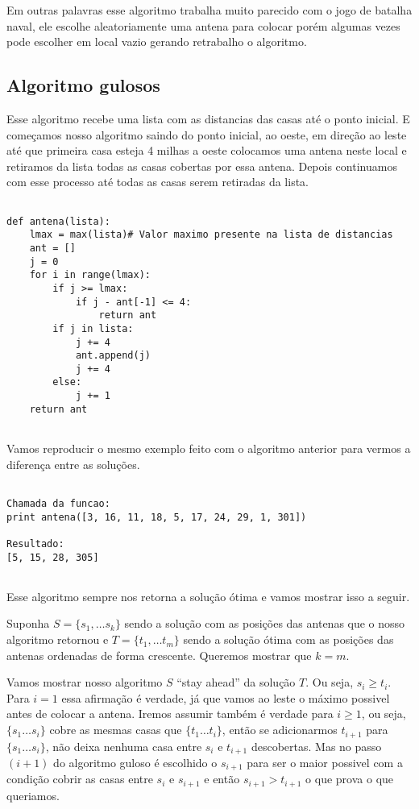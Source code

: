 \documentclass[11pt]{article}
\begin{document}
Em outras palavras esse algoritmo trabalha muito parecido com o jogo de batalha naval, ele escolhe aleatoriamente uma antena para
colocar porém algumas vezes pode escolher em local vazio gerando retrabalho o algoritmo.

\subsection{Algoritmo gulosos}

\label{sec-3-3}

Esse algoritmo recebe uma lista com as distancias das casas até o ponto inicial. 
E começamos nosso algoritmo saindo do ponto inicial, ao oeste, em direção ao leste até que primeira casa esteja 4 milhas a oeste 
colocamos uma antena neste local e retiramos da lista todas as casas cobertas por essa antena. Depois continuamos com esse processo
até todas as casas serem retiradas da lista.

\begin{verbatim}

def antena(lista):
    lmax = max(lista)# Valor maximo presente na lista de distancias
    ant = []
    j = 0
    for i in range(lmax):
        if j >= lmax:
            if j - ant[-1] <= 4:
                return ant
        if j in lista:
            j += 4
            ant.append(j)
            j += 4
        else:
            j += 1
    return ant
 
\end{verbatim}

Vamos reproducir o mesmo exemplo feito com o algoritmo anterior para vermos a diferença entre as soluções.

\begin{verbatim}

Chamada da funcao:
print antena([3, 16, 11, 18, 5, 17, 24, 29, 1, 301])

Resultado:
[5, 15, 28, 305]
 
\end{verbatim}

Esse algoritmo sempre nos retorna a solução ótima e vamos mostrar isso a seguir.

Suponha $S = \{ s_1, \ldots s_k \}$ sendo a solução com as posições das antenas 
que o nosso algoritmo retornou e $T = \{ t_1, \ldots t_m \}$ sendo a solução ótima com as posições 
das antenas ordenadas de forma crescente. Queremos mostrar que $k=m$.

Vamos mostrar nosso algoritmo $S$ ``stay ahead'' da solução $T$. Ou seja, $s_i \geq t_i$.
Para $i = 1$ essa afirmação é verdade, já que vamos ao leste o máximo possivel antes de colocar a antena.
Iremos assumir também é verdade para $ i \geq 1$, ou seja, $\{ s_1 \ldots s_i \}$ cobre as mesmas casas que $\{ t_1 \ldots t_i \}$, 
então se adicionarmos $t_{i+1}$ para $\{ s_1 \ldots s_i \}$, não deixa nenhuma casa entre $s_i$ e $t_{i+1}$ descobertas.
Mas no passo $(i+1)$ do algoritmo guloso é escolhido o $s_{i+1}$ para ser o maior possivel com a condição cobrir as casas entre $s_i$ e 
$s_{i+1}$ e então $s_{i+1} > t_{i+1}$ o que prova o que queriamos.
\end{document}
